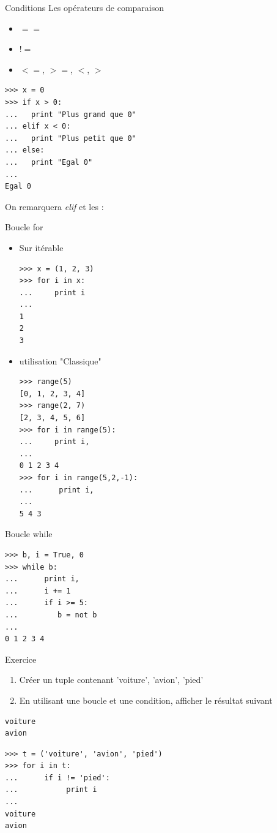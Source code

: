 \documentclass{beamer}
\begin{document}
\begin{frame}[fragile]{Conditions}
Les opérateurs de comparaison
\begin{itemize}
 \item $==$
 \item $!=$
 \item $<=$, $>=$, $<$, $>$
\end{itemize}

\begin{lstlisting}
>>> x = 0
>>> if x > 0:
...   print "Plus grand que 0"
... elif x < 0:
...   print "Plus petit que 0"
... else:
...   print "Egal 0"
... 
Egal 0
\end{lstlisting}

On remarquera \textit{elif} et les :

\end{frame}


\begin{frame}[fragile]{Boucle for}
\begin{itemize}
 \item Sur itérable
\begin{lstlisting}[multicols=2]
>>> x = (1, 2, 3)
>>> for i in x:
...     print i
... 
1
2
3
\end{lstlisting}

 \item utilisation "Classique"
\begin{lstlisting}[multicols=2]
>>> range(5)
[0, 1, 2, 3, 4]
>>> range(2, 7)
[2, 3, 4, 5, 6]
>>> for i in range(5):
...     print i,
... 
0 1 2 3 4
>>> for i in range(5,2,-1):
...      print i,
... 
5 4 3
\end{lstlisting}

\end{itemize}

\end{frame}

\begin{frame}[fragile]{Boucle while}
\begin{lstlisting}
>>> b, i = True, 0
>>> while b:
...      print i,
...      i += 1
...      if i >= 5:
...         b = not b
... 
0 1 2 3 4
\end{lstlisting}
\end{frame}

\begin{frame}[fragile]{Exercice}
\begin{enumerate}
 \item Créer un tuple contenant 'voiture', 'avion', 'pied'
 \item En utilisant une boucle et une condition, afficher le résultat suivant
\end{enumerate}
\begin{lstlisting}
voiture
avion
\end{lstlisting}
\pause

\begin{lstlisting}
>>> t = ('voiture', 'avion', 'pied')
>>> for i in t:
...      if i != 'pied':
...           print i
... 
voiture
avion
\end{lstlisting}

\end{frame}
\end{document}
